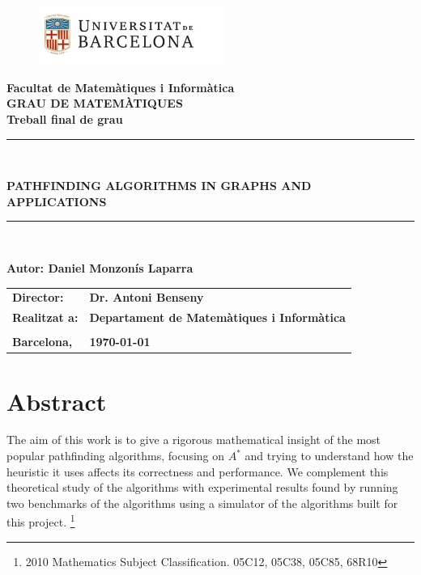 \documentclass[a4paper,10pt]{report}
\begin{document}
\pagestyle{empty}

\begin{titlepage}
\begin{center}
\begin{figure}[htb]
\begin{center}
\includegraphics[width=6cm]{ub.png}
\end{center}
\end{figure}

\textbf{\LARGE Facultat de Matemàtiques i Informàtica} \\
\vspace*{.5cm}
\textbf{\LARGE GRAU DE MATEMÀTIQUES } \\
\vspace*{.5cm}
\textbf{\LARGE Treball final de grau} \\
\vspace*{1.5cm}
\rule{16cm}{0.1mm}\\
\begin{Huge}
\textbf{PATHFINDING ALGORITHMS IN GRAPHS AND APPLICATIONS} \\
\end{Huge}
\rule{16cm}{0.1mm}\\

\vspace{1cm}

\begin{flushright}
\textbf{\LARGE Autor: Daniel Monzonís Laparra}

\vspace*{2cm}

\renewcommand{\arraystretch}{1.5}
\begin{tabular}{ll}
\textbf{\Large Director:} & \textbf{\Large Dr. Antoni Benseny} \\
\textbf{\Large Realitzat a:} & \textbf{\Large  Departament de Matemàtiques i Informàtica} \\
\\
\textbf{\Large Barcelona,} & \textbf{\Large \today }
\end{tabular}

\end{flushright}
\end{center}
\end{titlepage}


\section*{Abstract}
The aim of this work is to give a rigorous mathematical insight of the most popular pathfinding algorithms, focusing on $A^*$ and trying to understand how the heuristic it uses affects its correctness and performance. We complement this theoretical study of the algorithms with experimental results found by running two benchmarks of the algorithms using a simulator of the algorithms built for this project.
{\let\thefootnote\relax\footnote{2010 Mathematics Subject Classification. 05C12, 05C38, 05C85, 68R10}}
\end{document}

